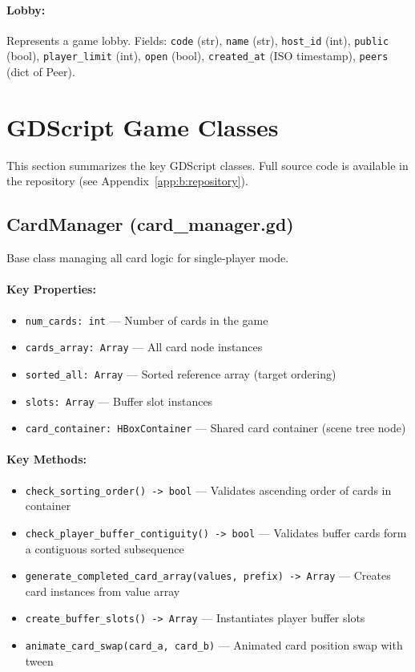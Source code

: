 \paragraph*{Lobby:} Represents a game lobby. Fields: \texttt{code} (str), \texttt{name} (str), \texttt{host\_id} (int), \texttt{public} (bool), \texttt{player\_limit} (int), \texttt{open} (bool), \texttt{created\_at} (ISO timestamp), \texttt{peers} (dict of Peer).

\section{GDScript Game Classes}
\label{app:c:gdscript-classes}

This section summarizes the key GDScript classes. Full source code is available in the repository (see Appendix~\ref{app:b:repository}).

\subsection{CardManager (card\_manager.gd)}
\label{app:c:card-manager-class}

Base class managing all card logic for single-player mode.

\paragraph*{Key Properties:}
\begin{itemize}
    \item \texttt{num\_cards: int} --- Number of cards in the game
    \item \texttt{cards\_array: Array} --- All card node instances
    \item \texttt{sorted\_all: Array} --- Sorted reference array (target ordering)
    \item \texttt{slots: Array} --- Buffer slot instances
    \item \texttt{card\_container: HBoxContainer} --- Shared card container (scene tree node)
\end{itemize}

\paragraph*{Key Methods:}
\begin{itemize}
    \item \texttt{check\_sorting\_order() -> bool} --- Validates ascending order of cards in container
    \item \texttt{check\_player\_buffer\_contiguity() -> bool} --- Validates buffer cards form a contiguous sorted subsequence
    \item \texttt{generate\_completed\_card\_array(values, prefix) -> Array} --- Creates card instances from value array
    \item \texttt{create\_buffer\_slots() -> Array} --- Instantiates player buffer slots
    \item \texttt{animate\_card\_swap(card\_a, card\_b)} --- Animated card position swap with tween
\end{itemize}

